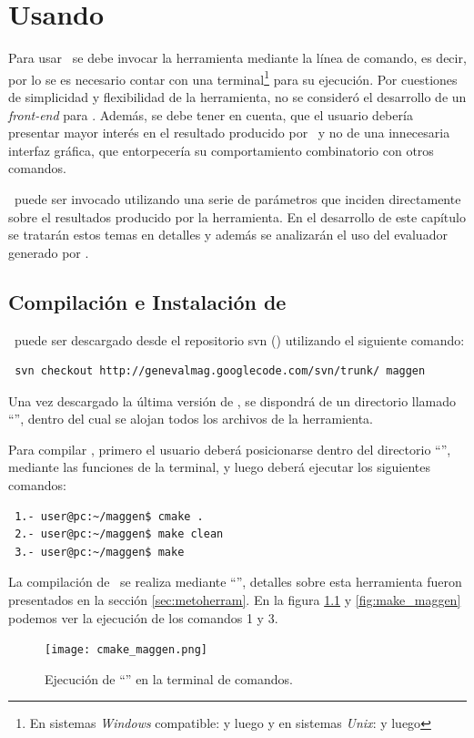 \chapter{Usando \maggen}
\label{chap:usos}
\minitoc

Para usar \maggen\ se debe invocar la herramienta mediante la línea de comando, es decir, por lo se es necesario contar con una terminal\footnote{En sistemas \textit{Windows} compatible:  y luego  y en sistemas \textit{Unix}:  y luego } para su ejecución. Por cuestiones de simplicidad y flexibilidad de la herramienta, no se consideró el desarrollo de un \textit{front-end} para \maggen. Además, se debe tener en cuenta, que el usuario debería presentar mayor interés en el resultado producido por \maggen\ y no de una innecesaria interfaz gráfica, que entorpecería su comportamiento combinatorio con otros comandos.
  
\maggen\ puede ser invocado utilizando una serie de parámetros que inciden directamente sobre el resultados producido por la herramienta. En el desarrollo de este capítulo se tratarán estos temas en detalles y además se analizarán el uso del evaluador generado por \maggen.

\section{Compilación e Instalación de \maggen}
\maggen\ puede ser descargado desde el repositorio svn (\cite{svn-book}) utilizando el siguiente comando:
\begin{verbatim}
 svn checkout http://genevalmag.googlecode.com/svn/trunk/ maggen
\end{verbatim}

Una vez descargado la última versión de \maggen, se dispondrá de un directorio llamado ``'', dentro del cual se alojan todos los archivos de la herramienta.

Para compilar \maggen, primero el usuario deberá posicionarse dentro del directorio ``'', mediante las funciones de la terminal, y luego deberá ejecutar los siguientes comandos:
{\small\begin{verbatim}
 1.- user@pc:~/maggen$ cmake .
 2.- user@pc:~/maggen$ make clean
 3.- user@pc:~/maggen$ make
\end{verbatim}}
La compilación de \maggen\ se realiza mediante ``'', detalles sobre esta herramienta fueron presentados en la sección \ref{sec:metoherram}. 
En la figura \ref{fig:cmake_maggen} y \ref{fig:make_maggen} podemos ver la ejecución de los comandos 1 y 3.
\begin{figure}[!ht]\centering
\texttt{[image: cmake\_maggen.png]}
\caption{\label{fig:cmake_maggen} Ejecución de ``'' en la terminal de comandos.}
\end{figure}

